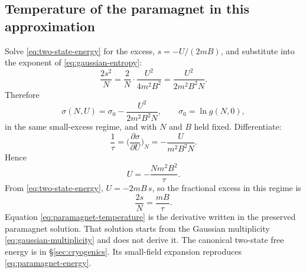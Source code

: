 \subsection{Temperature of the paramagnet in this approximation}

Solve \eqref{eq:two-state-energy} for the excess, \(s = -U/(2mB)\), and substitute into the exponent of \eqref{eq:gaussian-entropy}:
\begin{equation}
\frac{2s^2}{N}
= \frac{2}{N}\cdot\frac{U^2}{4 m^2 B^2}
= \frac{U^2}{2 m^2 B^2 N}.
\end{equation}
Therefore
\begin{equation}
\label{eq:paramagnet-entropy}
\sigma(N,U)
= \sigma_0 - \frac{U^2}{2 m^2 B^2 N},
\qquad
\sigma_0 = \ln g(N,0),
\end{equation}
in the same small-excess regime, and with \(N\) and \(B\) held fixed. Differentiate:
\begin{equation}
\label{eq:paramagnet-temperature}
\frac{1}{\tau}
= \biggl(\frac{\partial \sigma}{\partial U}\biggr)_{N}
= -\frac{U}{m^2 B^2 N}.
\end{equation}
Hence
\begin{equation}
\label{eq:paramagnet-energy}
U = -\frac{N m^2 B^2}{\tau}.
\end{equation}
From \eqref{eq:two-state-energy}, \(U = -2mB\, s\), so the fractional excess in this regime is
\begin{equation}
\label{eq:fractional-magnetization}
\frac{2s}{N} = \frac{mB}{\tau}.
\end{equation}
Equation \eqref{eq:paramagnet-temperature} is the derivative written in the preserved paramagnet solution. That solution starts from the Gaussian multiplicity \eqref{eq:gaussian-multiplicity} and does not derive it. The canonical two-state free energy is in \S\ref{sec:cryogenics}. Its small-field expansion reproduces \eqref{eq:paramagnet-energy}.
